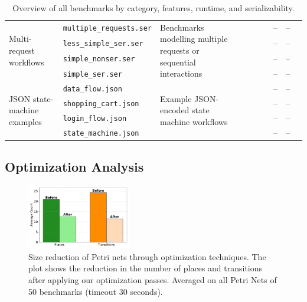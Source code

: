\begin{table}[ht]
{\begin{tabular}{%
				l   %
				l   %
				p{5cm}   %
				cccc  %
				rr    %
				c     %
			}
			\multirow{4}{*}{Multi-request workflows}
			& \texttt{multiple\_requests.ser}
			& \multirow{4}{5cm}{Benchmarks modelling multiple requests or sequential interactions}
			&  &  &  &  & -- & -- & \cmark \\
			& \texttt{less\_simple\_ser.ser}
			& 
			&  & \cmark &  & \cmark & -- & -- &  \\
			& \texttt{simple\_nonser.ser}
			& 
			&  &  &  &  & -- & -- &  \\
			& \texttt{simple\_ser.ser}
			& 
			&  &  &  & \cmark & -- & -- & \cmark \\
			\midrule
			
			\multirow{4}{*}{JSON state-machine examples}
			& \texttt{data\_flow.json}
			& \multirow{4}{5cm}{Example JSON-encoded state machine workflows}
			&  &  &  &  & -- & -- &  \\
			& \texttt{shopping\_cart.json}
			& 
			&  &  &  &  & -- & -- &  \\
			& \texttt{login\_flow.json}
			& 
			&  &  &  &  & -- & -- &  \\
			& \texttt{state\_machine.json}
			& 
			&  &  &  &  & -- & -- &  \\
			
			\bottomrule
		\end{tabular}%
	}
	\caption{Overview of all benchmarks by category, features, runtime, and serializability.}
	\label{tab:benchmarks}
\end{table}

\subsection{Optimization Analysis}


\begin{figure}[htbp]
	\centering
	\includegraphics[width=0.4\textwidth]{plots/petri_size_reduction_plot.pdf}
	\caption{Size reduction of Petri nets through optimization techniques. The plot shows the reduction in the number of places and transitions after applying our optimization passes. Averaged on all Petri Nets of 50 benchmarks (timeout 30 seconds).}
	\label{fig:petri_size_reduction}
\end{figure}


